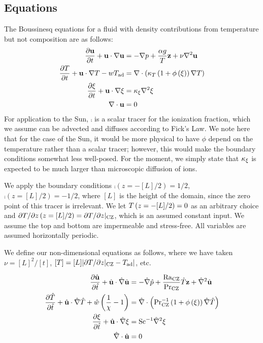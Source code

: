 \subsection{Equations} %
\label{sub:equations}

	The Boussinesq equations for a fluid with density contributions from temperature but not composition are as follows:
	\begin{align}
		\frac{\partial{\mathbf{u}}}{\partial{t}}+\mathbf{u}\cdot\nabla\mathbf{u}&=-\nabla p+\frac{\alpha g}{T}\mathbf{z}+\nu\nabla^{2}\mathbf{u}\\
		\frac{\partial{T}}{\partial{t}}+\mathbf{u}\cdot\nabla T-wT_{\mathrm{ad}}&=\nabla\cdot\left(\kappa_{T}\left(1+\phi\left(\xi\right)\right)\nabla T\right)\\
		\frac{\partial{\xi}}{\partial{t}}+\mathbf{u}\cdot\nabla\xi&=\kappa_{\xi}\nabla^{2}\xi\\
		\nabla\cdot\mathbf{u}&=0
	\end{align}
		For application to the Sun, $\comp$ is a scalar tracer for the ionization fraction, which we assume can be advected and diffuses according to Fick's Law.
		We note here that for the case of the Sun, it would be more physical to have $\phi$ depend on the temperature rather than a scalar tracer; however, this would make the boundary conditions somewhat less well-posed.
			For the moment, we simply state that $\kappa_{\xi}$ is expected to be much larger than microscopic diffusion of ions.	

	We apply the boundary conditions $\comp\left(z=-[L]/2\right)=1/2$, $\comp\left(z=[L]/2\right)=-1/2$, where $[L]$ is the height of the domain, since the zero point of this tracer is irrelevant.
		We let $T\left(z=-[L]/2\right)=0$ as an arbitrary choice and $\partial T/\partial z\left(z=[L]/2\right)=\partial T/\partial z|_{\mathrm{CZ}}$, which is an assumed constant input.
		We assume the top and bottom are impermeable and stress-free.
		All variables are assumed horizontally periodic.

	We define our non-dimensional equations as follows, where we have taken $\nu=[L]^{2}/[t]$, $[T]=[L]|\partial T/\partial z|_{\mathrm{CZ}}-T_{\mathrm{ad}}|$, etc.

	\begin{align}
		\frac{\partial{\hat{\mathbf{u}}}}{\partial{\hat{t}}}+\hat{\mathbf{u}}\cdot\hat{\nabla}\hat{\mathbf{u}}&=-\hat{\nabla}\hat{p}+\frac{\mathrm{Ra}_{\mathrm{CZ}}}{\mathrm{Pr}_{\mathrm{CZ}}}\hat{T}\mathbf{z}+\hat{\nabla}^{2}\hat{\mathbf{u}}\\
		\frac{\partial{\hat{T}}}{\partial{\hat{t}}}+\hat{\mathbf{u}}\cdot\hat{\nabla}\hat{T}+\hat{w}\left(\frac{1}{\chi}-1\right)&=\hat{\nabla}\cdot\left(\mathrm{Pr}^{-1}_{\mathrm{CZ}}\left(1+\phi\left(\xi\right)\right)\hat{\nabla}\hat{T}\right)\\
		\frac{\partial{\xi}}{\partial{\hat{t}}}+\hat{\mathbf{u}}\cdot\hat{\nabla}\xi&=\mathrm{Sc}^{-1}\hat{\nabla}^{2}\xi\\
		\hat{\nabla}\cdot\hat{\mathbf{u}}&=0
	\end{align}

